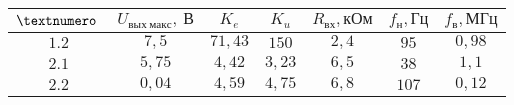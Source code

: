\begin{tabular}{| c | c | c | c | c | c | c |}
\hline
$№ \text{\:}$ & $U_{вых \: макс}, \: В$ & $K_e$ & $K_u$ & $R_{вх}, кОм$ & $f_н, Гц$ & $f_в, МГц$\\
\hline
$1.2$ & $7,5$ & $71,43$ & $150$ & $2,4$ & $95$ & $0,98$\\
\hline
$2.1$ & $5,75$ & $4,42$ & $3,23$ & $6,5$ & $38$ & $1,1$\\
\hline
$2.2$ & $0,04$ & $4,59$ & $4,75$ & $6,8$ & $107$ & $0,12$\\
\hline
\end{tabular}
